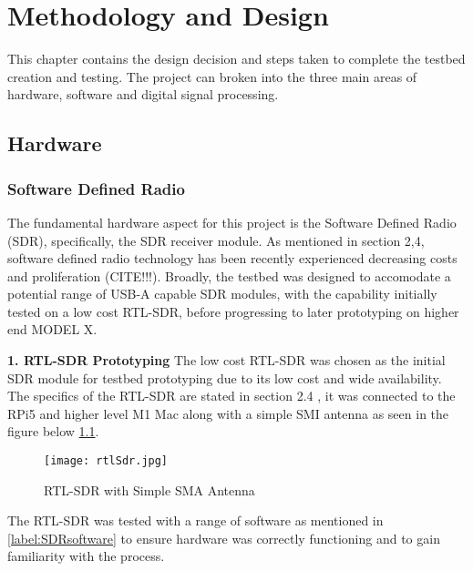 \chapter{Methodology and Design \label{sec:methodology}}

This chapter contains the design decision and steps taken to complete the testbed creation and testing. The project can broken into the three main areas of hardware, software and digital signal processing. 

\section{Hardware \label{sec:hardware}}

\subsection{Software Defined Radio \label{sec: SDRdongle}}
The fundamental hardware aspect for this project is the Software Defined Radio (SDR), specifically, the SDR receiver module.  As mentioned in section 2,4, software defined radio technology has been recently experienced decreasing costs and proliferation (CITE!!!). Broadly, the testbed was designed to accomodate a potential range of USB-A capable SDR modules, with the capability initially tested on a low cost RTL-SDR, before progressing to later prototyping on higher end MODEL X.

\vspace{0.5cm} \noindent 
\textbf{1. RTL-SDR Prototyping}
The low cost RTL-SDR was chosen as the initial SDR module for testbed prototyping  due to its low cost and wide availability. The specifics of the RTL-SDR are stated in section 2.4 , it was connected to the RPi5 and higher level M1 Mac along with a simple SMI antenna as seen in the figure below \ref*{fig:rtlSDR}. 

\begin{figure}[htbp]
    \centering
    \texttt{[image: rtlSdr.jpg]}
    \caption{RTL-SDR with Simple SMA Antenna}
    \label{fig:rtlSDR}
\end{figure}

The RTL-SDR was tested with a range of software as mentioned in \ref*{label:SDRsoftware} to ensure hardware was correctly functioning and to gain familiarity with the process. 

